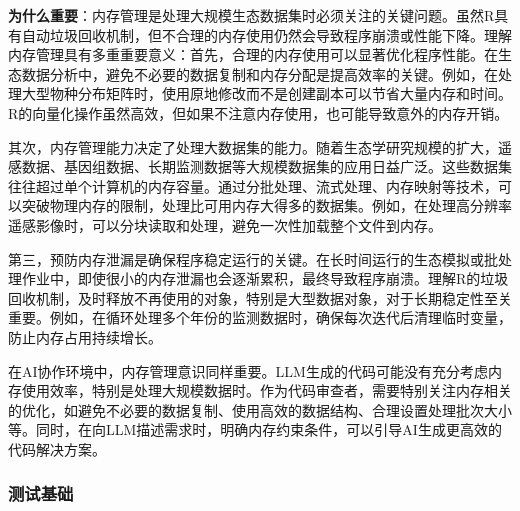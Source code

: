 \documentclass[
]{book}
\begin{document}
\textbf{为什么重要}：内存管理是处理大规模生态数据集时必须关注的关键问题。虽然R具有自动垃圾回收机制，但不合理的内存使用仍然会导致程序崩溃或性能下降。理解内存管理具有多重重要意义：首先，合理的内存使用可以显著优化程序性能。在生态数据分析中，避免不必要的数据复制和内存分配是提高效率的关键。例如，在处理大型物种分布矩阵时，使用原地修改而不是创建副本可以节省大量内存和时间。R的向量化操作虽然高效，但如果不注意内存使用，也可能导致意外的内存开销。

其次，内存管理能力决定了处理大数据集的能力。随着生态学研究规模的扩大，遥感数据、基因组数据、长期监测数据等大规模数据集的应用日益广泛。这些数据集往往超过单个计算机的内存容量。通过分批处理、流式处理、内存映射等技术，可以突破物理内存的限制，处理比可用内存大得多的数据集。例如，在处理高分辨率遥感影像时，可以分块读取和处理，避免一次性加载整个文件到内存。

第三，预防内存泄漏是确保程序稳定运行的关键。在长时间运行的生态模拟或批处理作业中，即使很小的内存泄漏也会逐渐累积，最终导致程序崩溃。理解R的垃圾回收机制，及时释放不再使用的对象，特别是大型数据对象，对于长期稳定性至关重要。例如，在循环处理多个年份的监测数据时，确保每次迭代后清理临时变量，防止内存占用持续增长。

在AI协作环境中，内存管理意识同样重要。LLM生成的代码可能没有充分考虑内存使用效率，特别是处理大规模数据时。作为代码审查者，需要特别关注内存相关的优化，如避免不必要的数据复制、使用高效的数据结构、合理设置处理批次大小等。同时，在向LLM描述需求时，明确内存约束条件，可以引导AI生成更高效的代码解决方案。

\hypertarget{ux6d4bux8bd5ux57faux7840}{%
\subsubsection{测试基础}\label{ux6d4bux8bd5ux57faux7840}}
\end{document}

